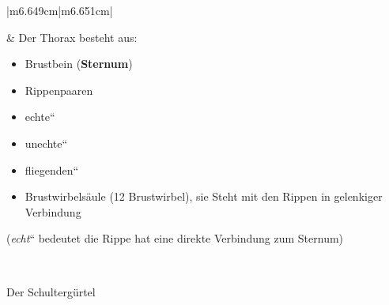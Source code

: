 \documentclass{article}
\newcommand\gT[1]{\textbf{\textup{\textcolor[rgb]{0.0,0.5019608,0.0}{#1}}}}
\begin{document}
\begin{center}
\tablehead{}\begin{supertabular}{|m{6.649cm}|m{6.651cm}|}
 

 &
{\mdseries Der Thorax besteht aus:}

\begin{itemize}
\item {\mdseries Brustbein 
(\gT{Sternum})}

\item {  Rippenpaaren }

\end{itemize}
\begin{itemize}
\item { {\quotedblbase}echte{\textquotedblleft}  }

\item { {\quotedblbase}unechte{\textquotedblleft}}

\item { {\quotedblbase}fliegenden{\textquotedblleft}}

\end{itemize}
\begin{itemize}
\item {\mdseries Brustwirbels\"aule (12 Brust\-wirbel), sie Steht mit
den Rippen in gelenkiger Verbindung }

\end{itemize}
{\mdseries ({\quotedblbase}\textit{echt}{\textquotedblleft} bedeutet die
Rippe hat eine direkte Verbindung zum Sternum)}

\\\hline
\end{supertabular}
\end{center}
{\mdseries\color[rgb]{0.0,0.0,0.5019608}
Der Schulterg\"urtel}
\end{document}
